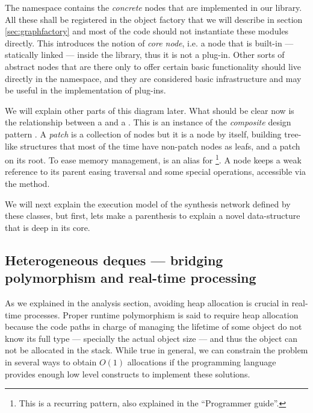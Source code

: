 The  namespace contains the \emph{concrete}
nodes that are implemented in our library. All these shall be
registered in the object factory that we will describe in section
\ref{sec:graphfactory} and most of the code should not instantiate
these modules directly. This introduces the notion of \emph{core
  node}, i.e. a node that is built-in --- statically
linked --- inside the library, thus it is not a plug-in. Other sorts
of abstract nodes that are there only to offer certain basic
functionality should live directly in the 
namespace, and they are considered basic infrastructure and may be
useful in the implementation of plug-ins.

We will explain other parts of this diagram later. What should be
clear now is the relationship between a  and a
. This is an instance of the \emph{composite} design
pattern \cite{gamma95design, vlissides98pattern}. A \emph{patch} is a
collection of nodes but it is a node by itself, building tree-like
structures that most of the time have non-patch nodes as leafs, and a
patch on its root. To ease memory management,  is an
alias for \footnote{This is a recurring
  pattern, also explained in the ``Programmer guide''.}. A node keeps a
weak reference to its parent easing traversal and some special
operations, accessible via the  method.

We will next explain the execution model of the synthesis network
defined by these classes, but first, lets make a parenthesis to
explain a novel data-structure that is deep in its core.

\subsection{Heterogeneous deques --- bridging polymorphism and
  real-time processing}

As we explained in the analysis section, avoiding heap allocation is
crucial in real-time processes. Proper runtime
polymorphism is said to require heap
allocation because the code paths in charge of
managing the lifetime of some object do not know its full type ---
specially the actual object size --- and thus the object can not be
allocated in the stack. While true in general, we can constrain the
problem in several ways to obtain $O (1)$ allocations if the
programming language provides enough low level constructs to implement
these solutions.

